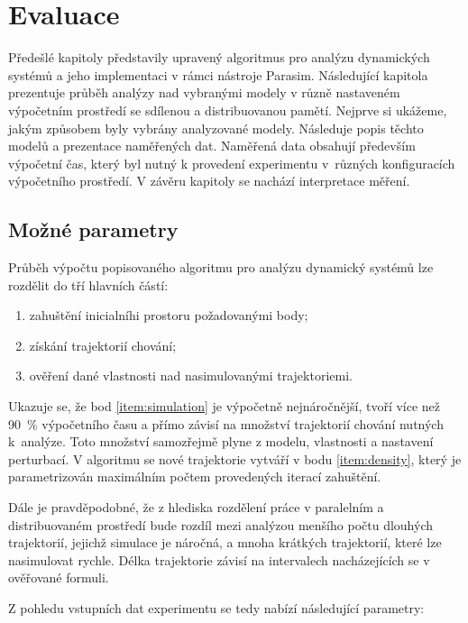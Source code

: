 \chapter{Evaluace}\label{chapter:evaluation}

Předešlé kapitoly představily upravený algoritmus pro analýzu dy\-na\-mic\-kých systémů
a jeho implementaci v rámci nástroje Parasim. Následující kapitola prezentuje průběh 
analýzy nad vybranými modely v různě nastaveném výpočetním prostředí se sdílenou a distribuovanou pamětí.
Nejprve si ukážeme, jakým způsobem byly vybrány analyzované modely. Následuje popis těchto modelů
a prezentace naměřených dat. Na\-mě\-ře\-ná data obsahují především
výpočetní čas, který byl nutný k provedení experimentu v~růz\-ných konfiguracích výpočetního
prostředí. V závěru kapitoly se na\-chá\-zí interpretace mě\-ře\-ní.

\section{Možné parametry}

Průběh výpočtu popisovaného algoritmu pro analýzu dynamický systémů lze rozdělit do tří hlavních částí:

\begin{enumerate}
	\item	zahuštění inicialníhi prostoru požadovanými body; \label{item:density}
	\item	získání trajektorií chování;\label{item:simulation}
	\item	ověření dané vlastnosti nad nasimulovanými trajektoriemi. 
\end{enumerate}

Ukazuje se, že bod \ref{item:simulation} je výpočetně nejnáročnější, tvoří více než 90~\% výpočetního času a přímo závisí na 
množství  trajektorií chování nutných k~analýze. Toto množství samozřejmě plyne z modelu, vlastnosti a nastavení perturbací.
V algoritmu se nové trajektorie vytváří v bodu \ref{item:density}, který je parametrizován maximálním
počtem provedených iterací zahuštění.

Dále je pravděpodobné, že z hlediska roz\-dě\-le\-ní práce v paralelním a distribuovaném
prostředí bude rozdíl mezi analýzou menšího počtu dlouhých trajektorií, jejichž simulace
je náročná, a mnoha krátkých trajektorií, které lze nasimulovat rychle. Délka trajektorie
závisí na intervalech nacházejících se v ověřované formuli. 

Z pohledu vstupních dat experimentu se tedy nabízí následující parametry:

